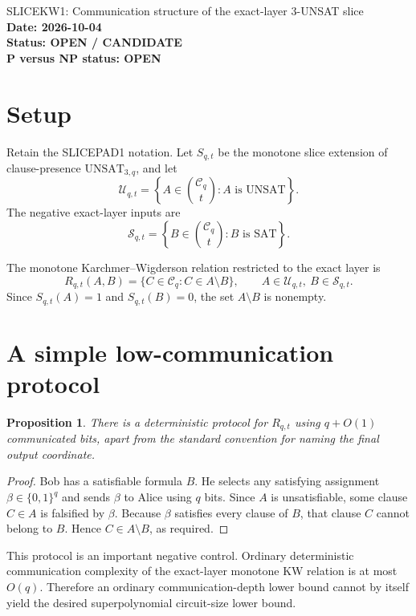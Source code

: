\documentclass[11pt]{article}
\newtheorem{proposition}{Proposition}
\begin{document}
\begin{center}
{\Large SLICEKW1: Communication structure of the exact-layer 3-UNSAT slice}\\[4pt]
\textbf{Date: 2026-10-04}\\
\textbf{Status: OPEN / CANDIDATE}\\
\textbf{P versus NP status: OPEN}
\end{center}

\section{Setup}

Retain the SLICEPAD1 notation.  Let \(S_{q,t}\) be the monotone slice extension of clause-presence
\(\mathrm{UNSAT}_{3,q}\), and let
\[
\mathcal U_{q,t}
=
\left\{
A\in\binom{\mathcal C_q}{t}:
A\text{ is UNSAT}
\right\}.
\]
The negative exact-layer inputs are
\[
\mathcal S_{q,t}
=
\left\{
B\in\binom{\mathcal C_q}{t}:
B\text{ is SAT}
\right\}.
\]

The monotone Karchmer--Wigderson relation restricted to the exact layer is
\[
R_{q,t}(A,B)
=
\{C\in\mathcal C_q:C\in A\setminus B\},
\qquad
A\in\mathcal U_{q,t},\ B\in\mathcal S_{q,t}.
\]
Since \(S_{q,t}(A)=1\) and \(S_{q,t}(B)=0\), the set \(A\setminus B\) is nonempty.

\section{A simple low-communication protocol}

\begin{proposition}
There is a deterministic protocol for \(R_{q,t}\) using \(q+O(1)\) communicated bits, apart from the standard convention for naming the final output coordinate.
\end{proposition}

\begin{proof}
Bob has a satisfiable formula \(B\).  He selects any satisfying assignment
\(\beta\in\{0,1\}^q\) and sends \(\beta\) to Alice using \(q\) bits.
Since \(A\) is unsatisfiable, some clause \(C\in A\) is falsified by \(\beta\).
Because \(\beta\) satisfies every clause of \(B\), that clause \(C\) cannot belong to \(B\).
Hence \(C\in A\setminus B\), as required.
\end{proof}

This protocol is an important negative control.  Ordinary deterministic communication complexity
of the exact-layer monotone KW relation is at most \(O(q)\).  Therefore an ordinary communication-depth lower bound cannot by itself yield the desired superpolynomial circuit-size lower bound.
\end{document}
